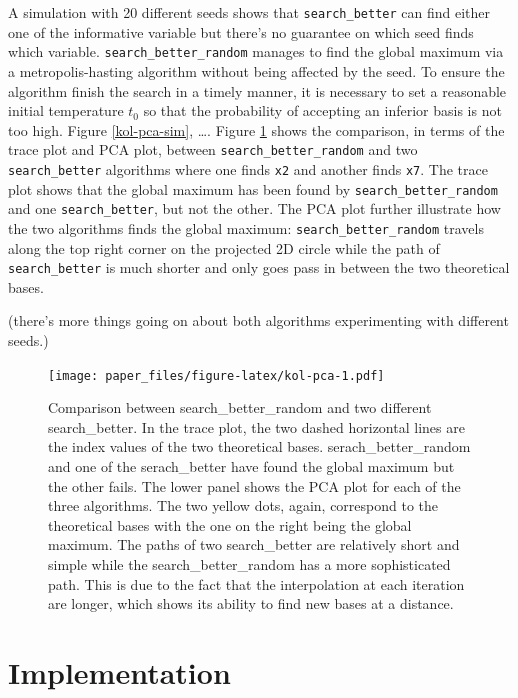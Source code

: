 \documentclass[12pt]{article}
\begin{document}
A simulation with 20 different seeds shows that \texttt{search\_better} can find either one of the informative variable but there's no guarantee on which seed finds which variable. \texttt{search\_better\_random} manages to find the global maximum via a metropolis-hasting algorithm without being affected by the seed. To ensure the algorithm finish the search in a timely manner, it is necessary to set a reasonable initial temperature \(t_0\) so that the probability of accepting an inferior basis is not too high. Figure \ref{kol-pca-sim}, \ldots{}. Figure \ref{kol-pca} shows the comparison, in terms of the trace plot and PCA plot, between \texttt{search\_better\_random} and two \texttt{search\_better} algorithms where one finds \texttt{x2} and another finds \texttt{x7}. The trace plot shows that the global maximum has been found by \texttt{search\_better\_random} and one \texttt{search\_better}, but not the other. The PCA plot further illustrate how the two algorithms finds the global maximum: \texttt{search\_better\_random} travels along the top right corner on the projected 2D circle while the path of \texttt{search\_better} is much shorter and only goes pass in between the two theoretical bases.

(there's more things going on about both algorithms experimenting with different seeds.)

\begin{figure}
\centering
\texttt{[image: paper\_files/figure-latex/kol-pca-1.pdf]}
\caption{\label{fig:kol-pca}\label{kol-pca}Comparison between search\_better\_random and two different search\_better. In the trace plot, the two dashed horizontal lines are the index values of the two theoretical bases. serach\_better\_random and one of the serach\_better have found the global maximum but the other fails. The lower panel shows the PCA plot for each of the three algorithms. The two yellow dots, again, correspond to the theoretical bases with the one on the right being the global maximum. The paths of two search\_better are relatively short and simple while the search\_better\_random has a more sophisticated path. This is due to the fact that the interpolation at each iteration are longer, which shows its ability to find new bases at a distance.}
\end{figure}

\hypertarget{implementation}{%
\section{Implementation}\label{implementation}}
\end{document}
